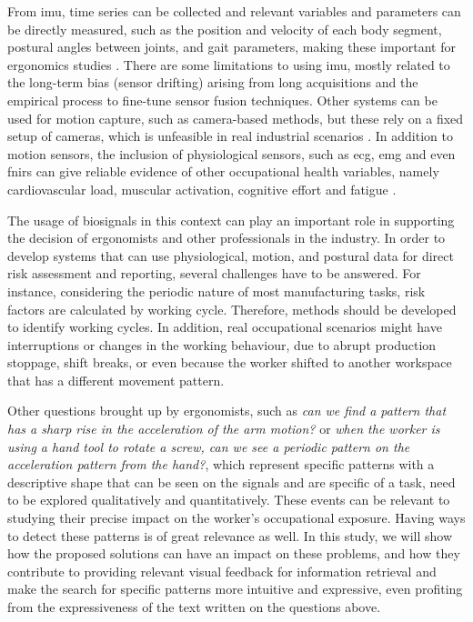 From \gls{imu}, time series can be collected and relevant variables and parameters can be directly measured, such as the position and velocity of each body segment, postural angles between joints, and gait parameters, making these important for ergonomics studies \cite{Caputo2019, Hang19}. There are some limitations to using \gls{imu}, mostly related to the long-term bias (sensor drifting) arising from long acquisitions and the empirical process to fine-tune sensor fusion techniques. Other systems can be used for motion capture, such as camera-based methods, but these rely on a fixed setup of cameras, which is unfeasible in real industrial scenarios \cite{sara}. In addition to motion sensors, the inclusion of physiological sensors, such as \gls{ecg}, \gls{emg} and even \gls{fnirs} can give reliable evidence of other occupational health variables, namely cardiovascular load, muscular activation, cognitive effort and fatigue \cite{silva_rip, cardiovascular_load, rythm_cyclic_work, rui_varandas}.

The usage of biosignals in this context can play an important role in supporting the decision of ergonomists and other professionals in the industry. In order to develop systems that can use physiological, motion, and postural data for direct risk assessment and reporting, several challenges have to be answered. For instance, considering the periodic nature of most manufacturing tasks, risk factors are calculated by working cycle. Therefore, methods should be developed to identify working cycles. In addition, real occupational scenarios might have interruptions or changes in the working behaviour, due to abrupt production stoppage, shift breaks, or even because the worker shifted to another workspace that has a different movement pattern. 

Other questions brought up by ergonomists, such as \textit{can we find a pattern that has a sharp rise in the acceleration of the arm motion?} or \textit{when the worker is using a hand tool to rotate a screw, can we see a periodic pattern on the acceleration pattern from the hand?}, which represent specific patterns with a descriptive shape that can be seen on the signals and are specific of a task, need to be explored qualitatively and quantitatively. These events can be relevant to studying their precise impact on the worker's occupational exposure. Having ways to detect these patterns is of great relevance as well. In this study, we will show how the proposed solutions can have an impact on these problems, and how they contribute to providing relevant visual feedback for information retrieval and make the search for specific patterns more intuitive and expressive, even profiting from the expressiveness of the text written on the questions above.

